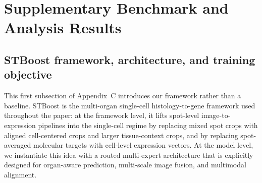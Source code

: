 \documentclass{article}
\newcommand{\dataset}{sMMC-22M\xspace}
\begin{document}
\begin{table}[t]
\centering
\scriptsize
\setlength{\tabcolsep}{5pt}
\caption{Main artifact types in the \dataset benchmark release.}
\label{tab:data_schema}
\end{table}


\section{Supplementary Benchmark and Analysis Results}
\subsection{STBoost framework, architecture, and training objective}
\label{sec:STBoost_appendix_details}
\noindent
This first subsection of Appendix~C introduces our framework rather than a baseline. STBoost is the multi-organ single-cell histology-to-gene framework used throughout the paper: at the framework level, it lifts spot-level image-to-expression pipelines into the single-cell regime by replacing mixed spot crops with aligned cell-centered crops and larger tissue-context crops, and by replacing spot-averaged molecular targets with cell-level expression vectors. At the model level, we instantiate this idea with a routed multi-expert architecture that is explicitly designed for organ-aware prediction, multi-scale image fusion, and multimodal alignment.
\end{document}
